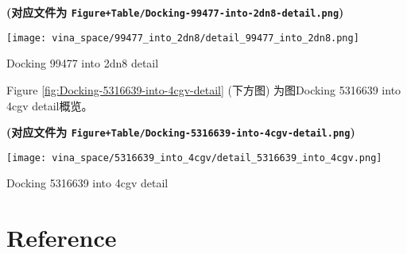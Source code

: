 \documentclass[
]{article}
\begin{document}
\textbf{(对应文件为 \texttt{Figure+Table/Docking-99477-into-2dn8-detail.png})}

\def\@captype{figure}
\begin{center}
\texttt{[image: vina\_space/99477\_into\_2dn8/detail\_99477\_into\_2dn8.png]}
\caption{Docking 99477 into 2dn8 detail}\label{fig:Docking-99477-into-2dn8-detail}
\end{center}

\begin{center}\vspace{1.5cm}\end{center}

\begin{center}\vspace{1.5cm}\end{center}

Figure \ref{fig:Docking-5316639-into-4cgv-detail} (下方图) 为图Docking 5316639 into 4cgv detail概览。

\textbf{(对应文件为 \texttt{Figure+Table/Docking-5316639-into-4cgv-detail.png})}

\def\@captype{figure}
\begin{center}
\texttt{[image: vina\_space/5316639\_into\_4cgv/detail\_5316639\_into\_4cgv.png]}
\caption{Docking 5316639 into 4cgv detail}\label{fig:Docking-5316639-into-4cgv-detail}
\end{center}

\begin{center}\vspace{1.5cm}\end{center}

\hypertarget{bibliography}{%
\section*{Reference}\label{bibliography}}
\end{document}
